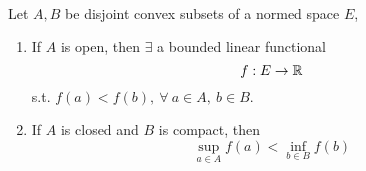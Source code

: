 \vspace{3pt}
\begin{theorem}\label{SepConvSets}\ \\
Let $A,B$ be disjoint convex subsets of a normed space $E$,
\begin{enumerate}[label = (\alph*)]
    \item If $A$ is open, then $\exists$ a bounded linear functional
    \begin{equation*}
        f: E \to \mathbb{R}
    \end{equation*}
    s.t. $f(a) < f(b),\ \forall\ a \in A,\ b \in B$.
    \item If $A$ is closed and $B$ is compact, then
    \begin{equation*}
        \sup_{a \in A} f(a) < \inf_{b \in B} f(b)
    \end{equation*}
\end{enumerate}
\end{theorem}
